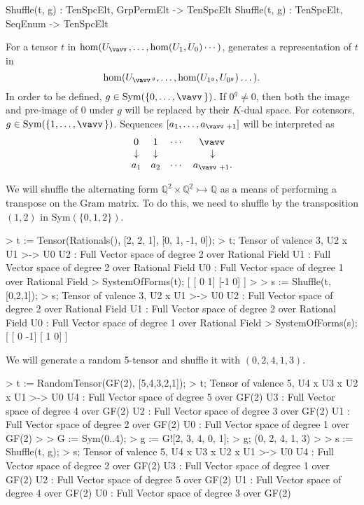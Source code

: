 \begin{intrinsics}
Shuffle(t, g) : TenSpcElt, GrpPermElt -> TenSpcElt
Shuffle(t, g) : TenSpcElt, SeqEnum -> TenSpcElt
\end{intrinsics}

For a tensor $t$ in $\hom(U_{\vav},\dots,\hom(U_1,U_0)\cdots)$, 
generates a representation of $t$ in 
\[ \hom(U_{{\vav}^g},\dots,\hom(U_{1^g},U_{0^g})\dots). \]
In order to be defined, $g\in\text{Sym}(\{0,\dots,\vav \})$. 
If $0^g\ne 0$, then both the image and pre-image of $0$ under $g$ will be replaced by their $K$-dual space.
For cotensors, $g\in\text{Sym}(\{1,\dots,\vav\})$.
Sequences $[a_1,\dots,a_{\vav+1}]$ will be interpreted as 
\[ \begin{array}{cccc} 0 & 1 & \cdots & \vav \\ \downarrow & \downarrow & & \downarrow \\ a_1 & a_2 & \cdots & a_{\vav+1}. \end{array}\]

\begin{example}[ShuffleToTranspose]

We will shuffle the alternating form $\mathbb{Q}^2\times\mathbb{Q}^2\rightarrowtail \mathbb{Q}$ as a means of performing a transpose on the Gram matrix.
To do this, we need to shuffle by the transposition $(1, 2)$ in Sym$(\{0,1,2\})$. 
\begin{code}
> t := Tensor(Rationals(), [2, 2, 1], [0, 1, -1, 0]);
> t;
Tensor of valence 3, U2 x U1 >-> U0
U2 : Full Vector space of degree 2 over Rational Field
U1 : Full Vector space of degree 2 over Rational Field
U0 : Full Vector space of degree 1 over Rational Field
> SystemOfForms(t);
[
    [ 0  1]
    [-1  0]
]
> 
> s := Shuffle(t, [0,2,1]);
> s;
Tensor of valence 3, U2 x U1 >-> U0
U2 : Full Vector space of degree 2 over Rational Field
U1 : Full Vector space of degree 2 over Rational Field
U0 : Full Vector space of degree 1 over Rational Field
> SystemOfForms(s);
[
    [ 0 -1]
    [ 1  0]
]
\end{code}
\end{example}

\begin{example}[Shuffling]

We will generate a random 5-tensor and shuffle it with $(0,2,4,1,3)$.
\begin{code}
> t := RandomTensor(GF(2), [5,4,3,2,1]);
> t;
Tensor of valence 5, U4 x U3 x U2 x U1 >-> U0
U4 : Full Vector space of degree 5 over GF(2)
U3 : Full Vector space of degree 4 over GF(2)
U2 : Full Vector space of degree 3 over GF(2)
U1 : Full Vector space of degree 2 over GF(2)
U0 : Full Vector space of degree 1 over GF(2)
> 
> G := Sym({0..4});
> g := G![2, 3, 4, 0, 1];
> g;
(0, 2, 4, 1, 3)
> 
> s := Shuffle(t, g);
> s;
Tensor of valence 5, U4 x U3 x U2 x U1 >-> U0
U4 : Full Vector space of degree 2 over GF(2)
U3 : Full Vector space of degree 1 over GF(2)
U2 : Full Vector space of degree 5 over GF(2)
U1 : Full Vector space of degree 4 over GF(2)
U0 : Full Vector space of degree 3 over GF(2)
\end{code}
\end{example}


